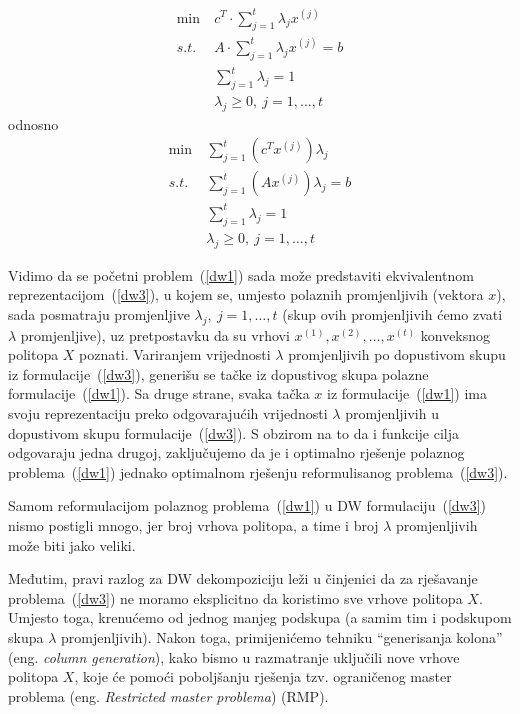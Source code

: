 \documentclass[a4paper, utf8, 11pt, colorlinks]{book}
\theoremstyle{definition}
\begin{document}
 
   \begin{equation}
 	\begin{aligned}\label{dw2}
 		\min\  &c^T\cdot \sum_{j=1}^t\lambda_jx^{(j)}\\
 		s.t.\  &A\cdot \sum_{j=1}^t\lambda_jx^{(j)}=b\\
 		 		 &\sum_{j=1}^t\lambda_j = 1\\
 		&\lambda_j\geqslant 0,\ j = 1,\ldots,t
 	\end{aligned}
 \end{equation}
odnosno
    \begin{equation}
 	\begin{aligned}\label{dw3}
 		\min\  & \sum_{j=1}^t(c^T x^{(j)})\lambda_j\\
 		s.t.\  &\sum_{j=1}^t (A x^{(j)})\lambda_j=b\\
 		&\sum_{j=1}^t\lambda_j = 1\\
 		&\lambda_j\geqslant 0,\ j = 1,\ldots,t
 	\end{aligned}
 \end{equation}
 
 Vidimo da se početni problem~(\ref{dw1}) sada može predstaviti ekvivalentnom reprezentacijom~(\ref{dw3}), u kojem se, umjesto polaznih promjenljivih (vektora $x$), sada posmatraju promjenljive $\lambda_j,\ j = 1,\ldots,t$ (skup ovih promjenljivih ćemo zvati $\lambda$ promjenljive), uz pretpostavku da su  vrhovi $x^{(1)},x^{(2)},\dots,x^{(t)}$ konveksnog politopa $X$ poznati. Variranjem vrijednosti $\lambda$ promjenljivih po dopustivom skupu iz formulacije~(\ref{dw3}), generišu se tačke iz dopustivog skupa polazne formulacije~(\ref{dw1}). Sa druge strane, svaka tačka $x$ iz formulacije~(\ref{dw1}) ima svoju reprezentaciju preko odgovarajućih vrijednosti  $\lambda$ promjenljivih u dopustivom skupu formulacije~(\ref{dw3}). S obzirom na to da i funkcije cilja odgovaraju jedna drugoj, zaključujemo da je i optimalno rješenje polaznog problema~(\ref{dw1}) jednako optimalnom rješenju reformulisanog problema~(\ref{dw3}).
 
 Samom reformulacijom polaznog problema~(\ref{dw1}) u DW formulaciju~(\ref{dw3}) nismo postigli mnogo, jer broj vrhova politopa, a time i broj $\lambda$ promjenljivih može biti jako veliki.
 
 Međutim, pravi razlog za DW dekompoziciju leži u činjenici da za rješavanje problema~(\ref{dw3}) ne moramo eksplicitno da koristimo sve vrhove politopa $X$. Umjesto toga, krenućemo od jednog   manjeg podskupa (a samim tim i podskupom skupa $\lambda$ promjenljivih). Nakon toga, primijenićemo tehniku ``generisanja kolona'' (eng. \emph{column generation}), kako bismo u razmatranje uključili nove vrhove politopa $X$, koje će pomoći poboljšanju rješenja tzv. ograničenog master problema (eng. \emph{Restricted master problema}) (RMP).
 
\end{document}
